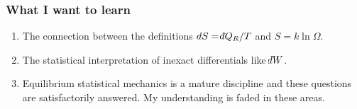 \documentclass{beamer}
\newcommand{\dbar}{{\mathchar'26\mkern-13mu d}}
\begin{document}
\begin{frame}
\frametitle{What I want to learn}
\begin{enumerate}
\item The connection between the definitions $dS = \dbar Q_R/T$ and $S = k\ln\Omega$.
\item The statistical interpretation of inexact differentials like $\dbar W$.
\item Equilibrium statistical mechanics is a mature discipline and these questions are satisfactorily answered. My understanding
is faded in these areas.
\end{enumerate}
\end{frame}
\end{document}
